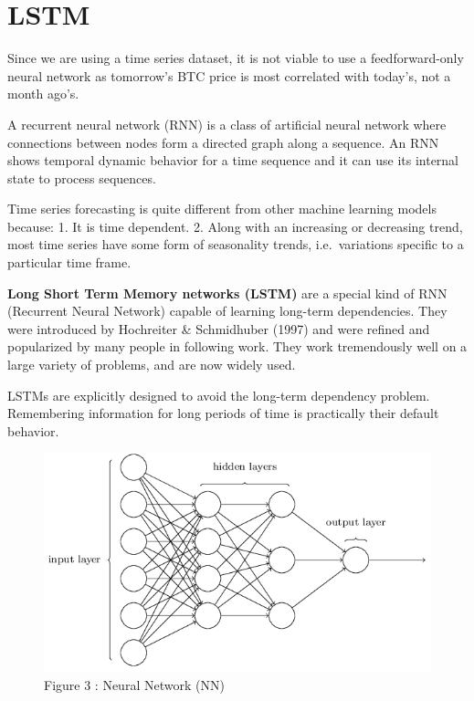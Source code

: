 \documentclass[11pt]{article}
\makeatletter
\def\maxwidth{\ifdim\Gin@nat@width>\linewidth\linewidth
    \else\Gin@nat@width\fi}
\let\Oldincludegraphics\includegraphics
\renewcommand{\includegraphics}[1]{\Oldincludegraphics[width=.8\maxwidth]{#1}}
\makeatother
\begin{document}
    \hypertarget{lstm}{%
\section{LSTM}\label{lstm}}

    Since we are using a time series dataset, it is not viable to use a
feedforward-only neural network as tomorrow's BTC price is most
correlated with today's, not a month ago's.

A recurrent neural network (RNN) is a class of artificial neural network
where connections between nodes form a directed graph along a sequence.
An RNN shows temporal dynamic behavior for a time sequence and it can
use its internal state to process sequences.

    Time series forecasting is quite different from other machine learning
models because: 1. It is time dependent. 2. Along with an increasing or
decreasing trend, most time series have some form of seasonality trends,
i.e.~variations specific to a particular time frame.

    \textbf{Long Short Term Memory networks (LSTM)} are a special kind of
RNN (Recurrent Neural Network) capable of learning long-term
dependencies. They were introduced by Hochreiter \& Schmidhuber (1997)
and were refined and popularized by many people in following work. They
work tremendously well on a large variety of problems, and are now
widely used.

    LSTMs are explicitly designed to avoid the long-term dependency problem.
Remembering information for long periods of time is practically their
default behavior.

\begin{figure}[H]
	\centering
		\includegraphics{nn.png}
		  \caption{Figure 3 : Neural Network (NN)}
\end{figure} 
    
\end{document}
